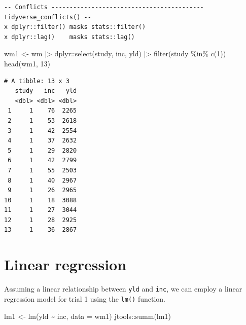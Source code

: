\documentclass[
  letterpaper,
]{book}
\newenvironment{Shaded}{\begin{snugshade}}{\end{snugshade}}
\newcommand{\AttributeTok}[1]{\textcolor[rgb]{0.40,0.45,0.13}{#1}}
\newcommand{\DecValTok}[1]{\textcolor[rgb]{0.68,0.00,0.00}{#1}}
\newcommand{\FunctionTok}[1]{\textcolor[rgb]{0.28,0.35,0.67}{#1}}
\newcommand{\NormalTok}[1]{\textcolor[rgb]{0.00,0.23,0.31}{#1}}
\newcommand{\OtherTok}[1]{\textcolor[rgb]{0.00,0.23,0.31}{#1}}
\newcommand{\SpecialCharTok}[1]{\textcolor[rgb]{0.37,0.37,0.37}{#1}}
\begin{document}
\begin{verbatim}
-- Conflicts ------------------------------------------ tidyverse_conflicts() --
x dplyr::filter() masks stats::filter()
x dplyr::lag()    masks stats::lag()
\end{verbatim}

\begin{Shaded}
\begin{Highlighting}[]
\NormalTok{wm1 }\OtherTok{\textless{}{-}}\NormalTok{ wm }\SpecialCharTok{|\textgreater{}} 
\NormalTok{  dplyr}\SpecialCharTok{::}\FunctionTok{select}\NormalTok{(study, inc, yld) }\SpecialCharTok{|\textgreater{}} 
  \FunctionTok{filter}\NormalTok{(study }\SpecialCharTok{\%in\%} \FunctionTok{c}\NormalTok{(}\DecValTok{1}\NormalTok{)) }
\FunctionTok{head}\NormalTok{(wm1, }\DecValTok{13}\NormalTok{)}
\end{Highlighting}
\end{Shaded}

\begin{verbatim}
# A tibble: 13 x 3
   study   inc   yld
   <dbl> <dbl> <dbl>
 1     1    76  2265
 2     1    53  2618
 3     1    42  2554
 4     1    37  2632
 5     1    29  2820
 6     1    42  2799
 7     1    55  2503
 8     1    40  2967
 9     1    26  2965
10     1    18  3088
11     1    27  3044
12     1    28  2925
13     1    36  2867
\end{verbatim}

\hypertarget{linear-regression-2}{%
\section{Linear regression}\label{linear-regression-2}}

Assuming a linear relationship between \texttt{yld} and \texttt{inc}, we
can employ a linear regression model for trial 1 using the \texttt{lm()}
function.

\begin{Shaded}
\begin{Highlighting}[]
\NormalTok{lm1 }\OtherTok{\textless{}{-}}  \FunctionTok{lm}\NormalTok{(yld }\SpecialCharTok{\textasciitilde{}}\NormalTok{ inc, }\AttributeTok{data =}\NormalTok{ wm1) }
\NormalTok{jtools}\SpecialCharTok{::}\FunctionTok{summ}\NormalTok{(lm1)}
\end{Highlighting}
\end{Shaded}
\end{document}
